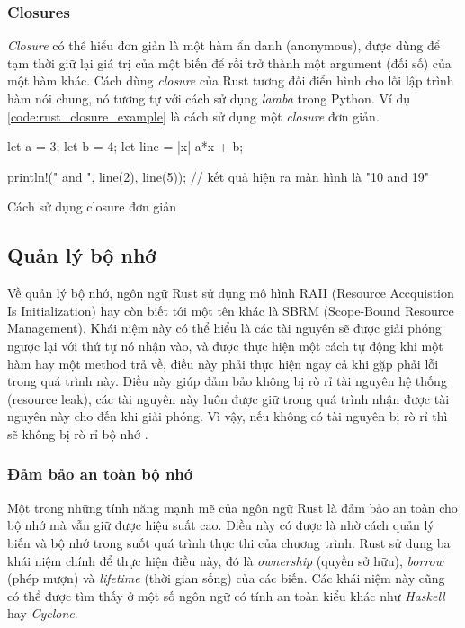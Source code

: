 \subsubsection{Closures}
\emph{Closure} có thể hiểu đơn giản là một hàm ẩn danh (anonymous), được dùng để tạm thời giữ lại giá trị của một biến để rồi trở thành một argument (đối số) của một hàm khác.
Cách dùng \emph{closure} của Rust tương đối điển hình cho lối lập trình hàm nói chung, nó tương tự với cách sử dụng \emph{lamba} trong Python.
Ví dụ \ref{code:rust_closure_example} là cách sử dụng một \emph{closure} đơn giản.
\begin{listing}[H]
\begin{rustcode}
let a = 3;
let b = 4;
let line = |x| a*x + b;

println!("{} and {}", line(2), line(5)); // kết quả hiện ra màn hình là "10 and 19"
\end{rustcode}
\caption{Cách sử dụng closure đơn giản}
\label{code:rust_closure_example}
\end{listing}

\subsection{Quản lý bộ nhớ}
Về quản lý bộ nhớ, ngôn ngữ Rust sử dụng mô hình RAII (Resource Accquistion Is Initialization) hay còn biết tới một tên khác là SBRM (Scope-Bound Resource Management).
Khái niệm này có thể hiểu là các tài nguyên sẽ được giải phóng ngược lại với thứ tự nó nhận vào, và được thực hiện một cách tự động khi một hàm hay một method trả về, điều này phải thực hiện ngay cả khi gặp phải lỗi trong quá trình này.
Điều này giúp đảm bảo không bị rò rỉ tài nguyên hệ thống (resource leak), các tài nguyên này luôn được giữ trong quá trình nhận được tài nguyên này cho đến khi giải phóng. Vì vậy, nếu không có tài nguyên bị rò rỉ thì sẽ không bị rò rỉ bộ nhớ \cite{phd_safe_type}.

\subsubsection{Đảm bảo an toàn bộ nhớ}
Một trong những tính năng mạnh mẽ của ngôn ngữ Rust là đảm bảo an toàn cho bộ nhớ mà vẫn giữ được hiệu suất cao.
Điều này có được là nhờ cách quản lý biến và bộ nhớ trong suốt quá trình thực thi của chương trình.
Rust sử dụng ba khái niệm chính để thực hiện điều này, đó là \emph{ownership} (quyền sở hữu), \emph{borrow} (phép mượn) và \emph{lifetime} (thời gian sống) của các biến.
Các khái niệm này cũng có thể được tìm thấy ở một số ngôn ngữ có tính an toàn kiểu khác như \emph{Haskell} hay \emph{Cyclone}.

